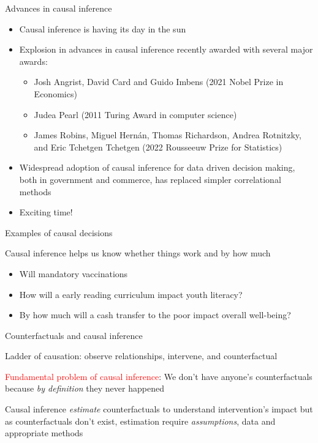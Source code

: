\documentclass{beamer}
\begin{document}
\begin{frame}{Advances in causal inference}

\begin{itemize}
\item Causal inference is having its day in the sun
\item Explosion in advances in causal inference recently awarded with several major awards: 
	\begin{itemize}
	\item Josh Angrist, David Card and Guido Imbens (2021 Nobel Prize in Economics)
	\item Judea Pearl (2011 Turing Award in computer science)
	\item James Robins, Miguel Hernán, Thomas Richardson, Andrea Rotnitzky, and Eric Tchetgen Tchetgen (2022 Rousseeuw Prize for Statistics)
	\end{itemize}
\item Widespread adoption of causal inference for data driven decision making, both in government and commerce, has replaced simpler correlational methods
\item Exciting time!
\end{itemize}

\end{frame}



\begin{frame}{Examples of causal decisions}

Causal inference helps us know whether things work and by how much

 
\bigskip


\begin{itemize}
\item  Will mandatory vaccinations 
\item  How will a early reading curriculum impact youth literacy?  
\item  By how much will a cash transfer to the poor impact overall well-being?
\end{itemize}


\end{frame}


\begin{frame}{Counterfactuals and causal inference}

 Ladder of causation: observe relationships, intervene, and counterfactual

\bigskip

\textcolor{red}{Fundamental problem of causal inference}: We don't have anyone's counterfactuals because \emph{by definition} they never happened

\bigskip

Causal inference \emph{estimate} counterfactuals to understand intervention's impact but as counterfactuals don't exist, estimation require \emph{assumptions}, data and appropriate methods


\end{frame}
\end{document}
